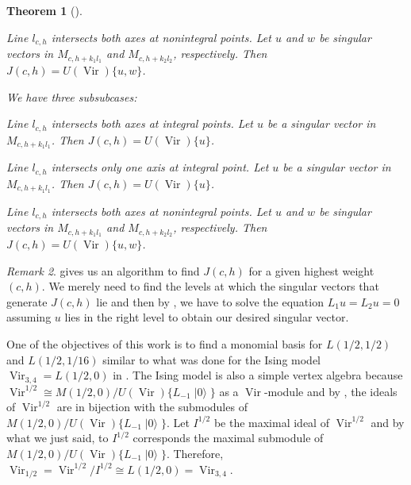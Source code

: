 \documentclass[a4paper, 12pt, reqno]{amsart}
\newtheorem{theorem}{Theorem}[subsection]
\theoremstyle{remark}
\newtheorem{remark}[theorem]{Remark}
\numberwithin{equation}{subsection}
\DeclareMathOperator{\Vir}{Vir}
\DeclareMathOperator{\vac}{|0\rangle}
\begin{document}
\begin{theorem}[{\cite{astashkevich_structure_1997}}]
\begin{description}[leftmargin = !]
\begin{description}[leftmargin = !]
\begin{description}[leftmargin = !]
      \item[Subsubcase III$_-$] Line $l_{c, h}$ intersects both axes at nonintegral points.
        Let $u$ and $w$ be singular vectors in $M_{c, h + k_1l_1}$ and $M_{c, h + k_2l_2}$, respectively.
        Then $J(c, h) = U(\Vir)\{u, w\}$.
      \end{description}
    \item[Subcase $c\ge 25$] We have three subsubcases:
      \begin{description}[leftmargin = !]
      \item[Subsubcase III$^{00}_+$] Line $l_{c, h}$ intersects both axes at integral points.
        Let $u$ be a singular vector in $M_{c, h + k_1l_1}$.
        Then $J(c, h) = U(\Vir)\{u\}$.
      \item[Subsubcase III$^0_+$] Line $l_{c, h}$ intersects only one axis at integral point.
        Let $u$ be a singular vector in $M_{c, h + k_1l_1}$.
        Then $J(c, h) = U(\Vir)\{u\}$.
      \item[Subsubcase III$_+$] Line $l_{c, h}$ intersects both axes at nonintegral points.
        Let $u$ and $w$ be singular vectors in $M_{c, h + k_1l_1}$ and $M_{c, h + k_2l_2}$, respectively.
        Then $J(c, h) = U(\Vir)\{u, w\}$.
      \end{description}
    \end{description}
  \end{description}
\end{theorem}

\begin{remark}
  \label{rmk:24}
   gives us an algorithm to find $J(c, h)$ for a given highest weight $(c, h)$.
  We merely need to find the levels at which the singular vectors that generate $J(c, h)$ lie and then by , we have to solve the equation $L_1u = L_2 u = 0$ assuming $u$ lies in the right level to obtain our desired singular vector.
\end{remark}

One of the objectives of this work is to find a monomial basis for $L(1/2, 1/2)$ and $L(1/2, 1/16)$ similar to what was done for the Ising model $\Vir_{3, 4} = L(1/2, 0)$ in \cite{andrews_singular_2022}.
The Ising model is also a simple vertex algebra because $\Vir^{1/2} \cong M(1/2, 0)/U(\Vir)\{L_{-1}\vac\}$ as a $\Vir$-module and by , the ideals of $\Vir^{1/2}$ are in bijection with the submodules of $M(1/2, 0)/U(\Vir)\{L_{-1}\vac\}$.
Let $I^{1/2}$ be the maximal ideal of $\Vir^{1/2}$ and by what we just said, to $I^{1/2}$ corresponds the maximal submodule of $M(1/2, 0)/U(\Vir)\{L_{-1}\vac\}$.
Therefore, $\Vir_{1/2} = \Vir^{1/2}/I^{1/2} \cong L(1/2, 0) = \Vir_{3, 4}$.
\end{document}
